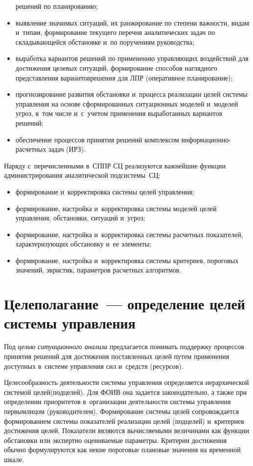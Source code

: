 \begin{multicols}{2}
\begin{itemize}
решений по планированию;
\item выявление значимых ситуаций, их ранжирование по степени 
важности, видам и~типам, формирование текущего перечня 
аналитических задач по складывающейся обстановке и~по поручениям 
руководства;
\item  выработка вариантов решений по применению управляющих 
воздействий для достижения целевых ситуаций, формирование спо\-собов 
наглядного представления вариантов\linebreak реше\-ния для ЛПР (оперативное 
планирование);
\item прогнозирование развития обстановки и~процесса реализации целей 
сис\-те\-мы управ\-ле\-ния на основе сформированных ситуационных моделей 
и~моделей угроз, в~том числе и~с~учетом применения выработанных 
вариантов решений;
\item обеспечение процессов принятия решений комплексом  
ин\-фор\-ма\-ци\-он\-но-рас\-чет\-ных задач (ИРЗ).
    \end{itemize}
    
    Наряду с~перечисленными в~СППР СЦ реализуются важнейшие функции 
администрирования аналитической под\-сис\-те\-мы~СЦ:
    \begin{itemize}
\item формирование и~корректировка сис\-те\-мы целей управ\-ления;
\item формирование, настройка и~корректировка сис\-те\-мы моделей целей 
управления, обстановки, ситуаций и~угроз;
\item формирование, настройка и~корректировка сис\-те\-мы расчетных 
показателей, характеризующих обстановку и~ее элементы;
\item формирование, настройка и~корректировка сис\-те\-мы критериев, 
пороговых значений, эвристик, параметров расчетных алгоритмов.
\end{itemize}

\section{Целеполагание~--- определение целей системы управления}

    Под \textit{целью ситуационного анализа} предлагается понимать 
поддержку процессов принятия решений для достижения поставленных 
целей путем применения доступных в~сис\-те\-ме управ\-ле\-ния сил и~средств 
(ресурсов).
    
    Целесообразность деятельности сис\-те\-мы управ\-ле\-ния определяется 
иерархической сис\-те\-мой целей\linebreak (подцелей). Для ФОИВ она задается 
законодательно, а также при определении приоритетов в~орга\-низации 
деятельности сис\-те\-мы управ\-ле\-ния первым\linebreak лицом (руководителем). 
Формирование сис\-те\-мы целей сопровождается формированием сис\-те\-мы 
показателей реализации целей (подцелей) и~критериев достижения целей. 
Показатели являются вычисляемыми величинами как функции обстановки 
или экспертно оцениваемые параметры. Критерии достижения обычно 
формулируются как некие пороговые плановые значения на временн$\acute{\mbox{о}}$й 
шкале.
    

\end{multicols}
